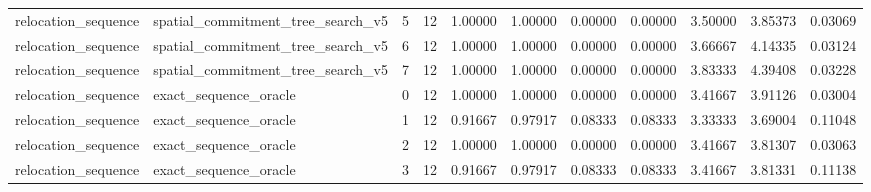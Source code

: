\documentclass{article}
\begin{document}
\begin{table}[tbp]
{\begin{tabular}{lllllllllll}
relocation\_sequence & spatial\_commitment\_tree\_search\_v5 & 5 & 12 & 1.00000 & 1.00000 & 0.00000 & 0.00000 & 3.50000 & 3.85373 & 0.03069 \\
relocation\_sequence & spatial\_commitment\_tree\_search\_v5 & 6 & 12 & 1.00000 & 1.00000 & 0.00000 & 0.00000 & 3.66667 & 4.14335 & 0.03124 \\
relocation\_sequence & spatial\_commitment\_tree\_search\_v5 & 7 & 12 & 1.00000 & 1.00000 & 0.00000 & 0.00000 & 3.83333 & 4.39408 & 0.03228 \\
relocation\_sequence & exact\_sequence\_oracle & 0 & 12 & 1.00000 & 1.00000 & 0.00000 & 0.00000 & 3.41667 & 3.91126 & 0.03004 \\
relocation\_sequence & exact\_sequence\_oracle & 1 & 12 & 0.91667 & 0.97917 & 0.08333 & 0.08333 & 3.33333 & 3.69004 & 0.11048 \\
relocation\_sequence & exact\_sequence\_oracle & 2 & 12 & 1.00000 & 1.00000 & 0.00000 & 0.00000 & 3.41667 & 3.81307 & 0.03063 \\
relocation\_sequence & exact\_sequence\_oracle & 3 & 12 & 0.91667 & 0.97917 & 0.08333 & 0.08333 & 3.41667 & 3.81331 & 0.11138 \\
\bottomrule
\end{tabular}
}
\end{table}

\clearpage

\begin{table}[tbp]
\centering
\scriptsize
\setlength{\tabcolsep}{3.0pt}
\caption{Seed-level main metrics continued (613-616)}
\end{table}
\end{document}
